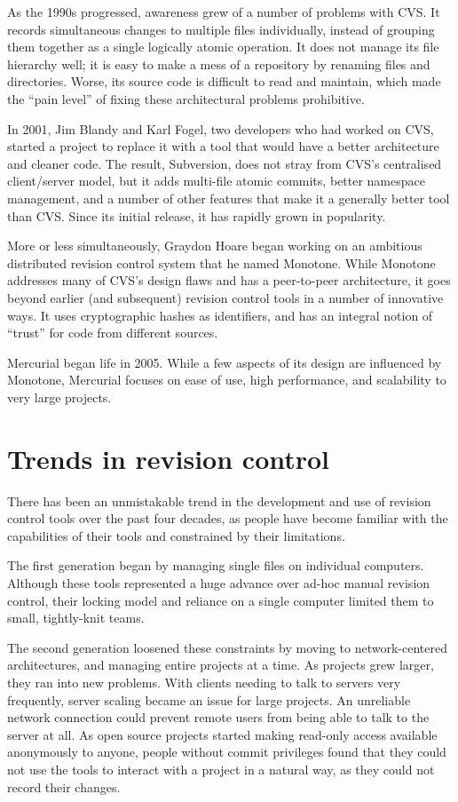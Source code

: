 As the 1990s progressed, awareness grew of a number of problems with
CVS.  It records simultaneous changes to multiple files individually,
instead of grouping them together as a single logically atomic
operation.  It does not manage its file hierarchy well; it is easy to
make a mess of a repository by renaming files and directories.  Worse,
its source code is difficult to read and maintain, which made the
``pain level'' of fixing these architectural problems prohibitive.

In 2001, Jim Blandy and Karl Fogel, two developers who had worked on
CVS, started a project to replace it with a tool that would have a
better architecture and cleaner code.  The result, Subversion, does
not stray from CVS's centralised client/server model, but it adds
multi-file atomic commits, better namespace management, and a number
of other features that make it a generally better tool than CVS.
Since its initial release, it has rapidly grown in popularity.

More or less simultaneously, Graydon Hoare began working on an
ambitious distributed revision control system that he named Monotone.
While Monotone addresses many of CVS's design flaws and has a
peer-to-peer architecture, it goes beyond earlier (and subsequent)
revision control tools in a number of innovative ways.  It uses
cryptographic hashes as identifiers, and has an integral notion of
``trust'' for code from different sources.

Mercurial began life in 2005.  While a few aspects of its design are
influenced by Monotone, Mercurial focuses on ease of use, high
performance, and scalability to very large projects.

\section{Trends in revision control}

There has been an unmistakable trend in the development and use of
revision control tools over the past four decades, as people have
become familiar with the capabilities of their tools and constrained
by their limitations.

The first generation began by managing single files on individual
computers.  Although these tools represented a huge advance over
ad-hoc manual revision control, their locking model and reliance on a
single computer limited them to small, tightly-knit teams.

The second generation loosened these constraints by moving to
network-centered architectures, and managing entire projects at a
time.  As projects grew larger, they ran into new problems.  With
clients needing to talk to servers very frequently, server scaling
became an issue for large projects.  An unreliable network connection
could prevent remote users from being able to talk to the server at
all.  As open source projects started making read-only access
available anonymously to anyone, people without commit privileges
found that they could not use the tools to interact with a project in
a natural way, as they could not record their changes.

